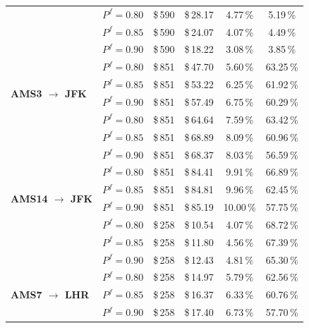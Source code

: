 \begin{center}
\begin{longtable}{l c | c c c c}
    ~  &  $P^f = 0.80$  &  \$\,590  & \$\,28.17  & 4.77\,\%     & 5.19\,\% \\ 
    ~  &  $P^f = 0.85$  &  \$\,590  & \$\,24.07  & 4.07\,\%     & 4.49\,\% \\ 
    ~  &  $P^f = 0.90$  &  \$\,590  & \$\,18.22  & 3.08\,\%     & 3.85\,\% \\ 
    \hline
    \multirow{4}{*}{\parbox[c]{1cm}{\centering \textbf{  AMS3  $\to$  JFK  }}}
    ~  &  $P^f = 0.80$  &  \$\,851  & \$\,47.70  & 5.60\,\%     & 63.25\,\% \\ 
    ~  &  $P^f = 0.85$  &  \$\,851  & \$\,53.22  & 6.25\,\%     & 61.92\,\% \\ 
    ~  &  $P^f = 0.90$  &  \$\,851  & \$\,57.49  & 6.75\,\%     & 60.29\,\% \\ 
    \hline
    \multirow{4}{*}{\parbox[c]{1cm}{\centering \textbf{  AMS7  $\to$  JFK  }}}
    ~  &  $P^f = 0.80$  &  \$\,851  & \$\,64.64  & 7.59\,\%     & 63.42\,\% \\ 
    ~  &  $P^f = 0.85$  &  \$\,851  & \$\,68.89  & 8.09\,\%     & 60.96\,\% \\ 
    ~  &  $P^f = 0.90$  &  \$\,851  & \$\,68.37  & 8.03\,\%     & 56.59\,\% \\ 
    \hline
    \multirow{4}{*}{\parbox[c]{1cm}{\centering \textbf{  AMS14  $\to$  JFK  }}}
    ~  &  $P^f = 0.80$  &  \$\,851  & \$\,84.41  & 9.91\,\%     & 66.89\,\% \\ 
    ~  &  $P^f = 0.85$  &  \$\,851  & \$\,84.81  & 9.96\,\%     & 62.45\,\% \\ 
    ~  &  $P^f = 0.90$  &  \$\,851  & \$\,85.19  & 10.00\,\%     & 57.75\,\% \\ 
    \hline
    \multirow{4}{*}{\parbox[c]{1cm}{\centering \textbf{  AMS3  $\to$  LHR  }}}
    ~  &  $P^f = 0.80$  &  \$\,258  & \$\,10.54  & 4.07\,\%     & 68.72\,\% \\ 
    ~  &  $P^f = 0.85$  &  \$\,258  & \$\,11.80  & 4.56\,\%     & 67.39\,\% \\ 
    ~  &  $P^f = 0.90$  &  \$\,258  & \$\,12.43  & 4.81\,\%     & 65.30\,\% \\ 
    \hline
    \multirow{4}{*}{\parbox[c]{1cm}{\centering \textbf{  AMS7  $\to$  LHR  }}}
    ~  &  $P^f = 0.80$  &  \$\,258  & \$\,14.97  & 5.79\,\%     & 62.56\,\% \\ 
    ~  &  $P^f = 0.85$  &  \$\,258  & \$\,16.37  & 6.33\,\%     & 60.76\,\% \\ 
    ~  &  $P^f = 0.90$  &  \$\,258  & \$\,17.40  & 6.73\,\%     & 57.70\,\% \\ 

\end{longtable}
\end{center}
